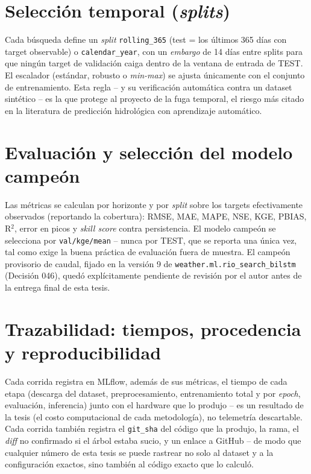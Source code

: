 \section{Selecci\'on temporal (\emph{splits})}

Cada b\'usqueda define un \emph{split} \texttt{rolling\_365} (test = los \'ultimos 365 d\'ias con
target observable) o \texttt{calendar\_year}, con un \emph{embargo} de 14 d\'ias entre splits para
que ning\'un target de validaci\'on caiga dentro de la ventana de entrada de TEST. El escalador
(est\'andar, robusto o \emph{min-max}) se ajusta \'unicamente con el conjunto de entrenamiento.
Esta regla -- y su verificaci\'on autom\'atica contra un dataset sint\'etico -- es la que protege
al proyecto de la fuga temporal, el riesgo m\'as citado en la literatura de predicci\'on
hidrol\'ogica con aprendizaje autom\'atico.

\section{Evaluaci\'on y selecci\'on del modelo campe\'on}
\label{sec:evaluacion}

Las m\'etricas se calculan por horizonte y por \emph{split} sobre los targets efectivamente
observados (reportando la cobertura): RMSE, MAE, MAPE, NSE, KGE, PBIAS, R$^2$, error en picos y
\emph{skill score} contra persistencia. El modelo campe\'on se selecciona por
\texttt{val/kge/mean} -- nunca por TEST, que se reporta una \'unica vez, tal como exige la buena
pr\'actica de evaluaci\'on fuera de muestra. El campe\'on provisorio de caudal, fijado en la
versi\'on 9 de \texttt{weather.ml.rio\_search\_bilstm} (Decisi\'on 046), qued\'o expl\'icitamente
pendiente de revisi\'on por el autor antes de la entrega final de esta tesis.

\section{Trazabilidad: tiempos, procedencia y reproducibilidad}

Cada corrida registra en MLflow, adem\'as de sus m\'etricas, el tiempo de cada etapa (descarga del
dataset, preprocesamiento, entrenamiento total y por \emph{epoch}, evaluaci\'on, inferencia) junto
con el hardware que lo produjo -- es un resultado de la tesis (el costo computacional de cada
metodolog\'ia), no telemetr\'ia descartable. Cada corrida tambi\'en registra el \texttt{git\_sha}
del c\'odigo que la produjo, la rama, el \emph{diff} no confirmado si el \'arbol estaba sucio, y
un enlace a GitHub -- de modo que cualquier n\'umero de esta tesis se puede rastrear no solo al
dataset y a la configuraci\'on exactos, sino tambi\'en al c\'odigo exacto que lo calcul\'o.

